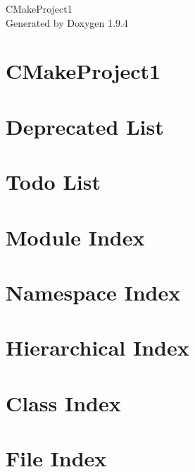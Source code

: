 \documentclass[twoside]{book}
\newcommand{\+}{\discretionary{\mbox{\scriptsize$\hookleftarrow$}}{}{}}
\newcommand{\clearemptydoublepage}{%
    \newpage{\pagestyle{empty}\cleardoublepage}%
  }
\begin{document}
  \raggedbottom
    \hypersetup{pageanchor=false,
                bookmarksnumbered=true,
                pdfencoding=unicode
               }
  \begin{titlepage}
  \vspace*{7cm}
  \begin{center}%
  {\Large CMake\+Project1}\\
  \vspace*{1cm}
  {\large Generated by Doxygen 1.9.4}\\
  \end{center}
  \end{titlepage}
  \clearemptydoublepage
  \tableofcontents
  \clearemptydoublepage
  \hypersetup{pageanchor=true}
\chapter{CMake\+Project1}
\label{index}\hypertarget{index}{}
\chapter{Deprecated List}
\label{deprecated}

\chapter{Todo List}
\label{todo}

\chapter{Module Index}

\chapter{Namespace Index}

\chapter{Hierarchical Index}

\chapter{Class Index}

\chapter{File Index}

\end{document}
